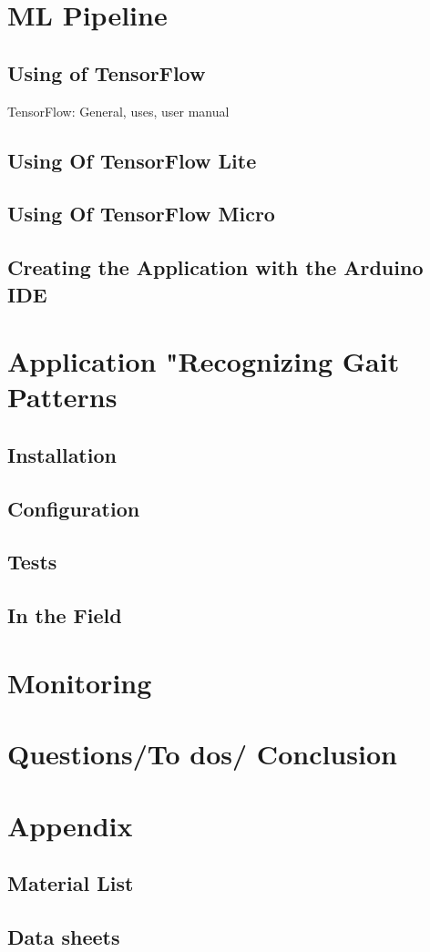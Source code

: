 \section{ML Pipeline}
\subsection{Using of TensorFlow}
TensorFlow: General, uses, user manual  

\subsection{Using Of TensorFlow Lite}
\subsection{Using Of TensorFlow Micro}
\subsection{Creating the Application with the Arduino IDE}
\section{Application "Recognizing Gait Patterns}
\subsection{Installation}
\subsection{Configuration}
\subsection{Tests}
\subsection{In the Field}
\section{Monitoring}
\section{Questions/To dos/ Conclusion}
\section{Appendix}
\subsection{Material List}
\subsection{Data sheets}